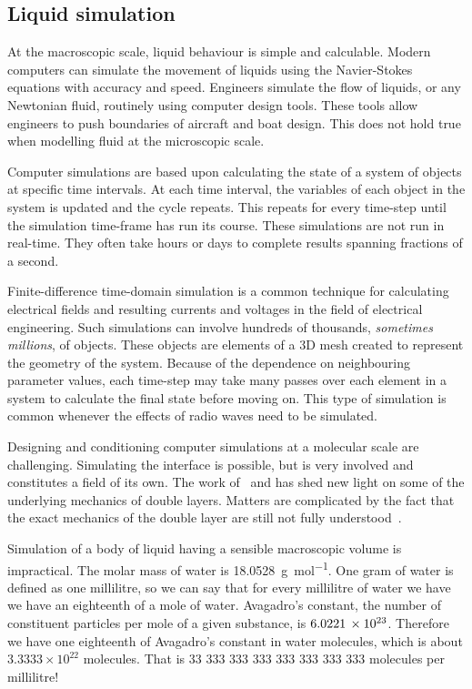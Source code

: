   \subsection{Liquid simulation}
    \label{sub:molecularSimulation}

    At the macroscopic scale, liquid behaviour is simple and calculable.
    Modern computers can simulate the movement of liquids using the Navier-Stokes equations with accuracy and speed.
    Engineers simulate the flow of liquids, or any Newtonian fluid, routinely using computer design tools.
    These tools allow engineers to push boundaries of aircraft and boat design.
    This does not hold true when modelling fluid at the microscopic scale.

    Computer simulations are based upon calculating the state of a system of objects at specific time intervals.
    At each time interval, the variables of each object in the system is updated and the cycle repeats.
    This repeats for every time-step until the simulation time-frame has run its course.
    These simulations are not run in real-time.
    They often take hours or days to complete results spanning fractions of a second.

    Finite-difference time-domain simulation is a common technique for calculating electrical fields and resulting currents and voltages in the field of electrical engineering.
    Such simulations can involve hundreds of thousands, \emph{sometimes millions}, of objects.
    These objects are elements of a 3D mesh created to represent the geometry of the system.
    Because of the dependence on neighbouring parameter values, each time-step may take many passes over each element in a system to calculate the final state before moving on.
    This type of simulation is common whenever the effects of radio waves need to be simulated.

    Designing and conditioning computer simulations at a molecular scale are challenging.
    Simulating the interface is possible, but is very involved and constitutes a field of its own.
    The work of~\cite{Nagy1992} and \cite{Bazant2011} has shed new light on some of the underlying mechanics of double layers.
    Matters are complicated by the fact that the exact mechanics of the double layer are still not fully understood~\cite{Kornyshev2007}.

    Simulation of a body of liquid having a sensible macroscopic volume is impractical.
    The molar mass of water is \SI{18.0528}{\gram\per\mole}.
    One gram of water is defined as one millilitre, so we can say that for every millilitre of water we have we have an eighteenth of a mole of water.
    Avagadro's constant, the number of constituent particles per mole of a given substance, is $6.0221\thinspace \times 10^{23}$.
    Therefore we have one eighteenth of Avagadro's constant in water molecules, which is about $3.3333\times 10^{22}$ molecules.
    That is 33 333 333 333 333 333 333 333 molecules per millilitre!


